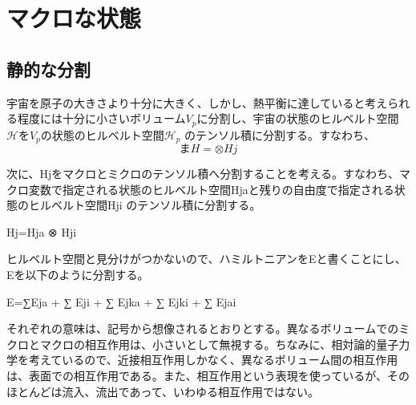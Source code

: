 \section{マクロな状態}
\subsection{静的な分割}
宇宙を原子の大きさより十分に大きく、しかし、熱平衡に達していると考えられる程度には十分に小さいボリューム$V_p$に分割し、宇宙の状態のヒルベルト空間$\mathcal{H}$を$V_p$の状態のヒルベルト空間$\mathcal{H}_p$ のテンソル積に分割する。すなわち、
\begin{equation}
まH=⊗Hj
\end{equation}

次に、Hjをマクロとミクロのテンソル積へ分割することを考える。すなわち、マクロ変数で指定される状態のヒルベルト空間Hjaと残りの自由度で指定される状態のヒルベルト空間Hji のテンソル積に分割する。

Hj=Hja ⊗ Hji

ヒルベルト空間と見分けがつかないので、ハミルトニアンをEと書くことにし、Eを以下のように分割する。

E=∑Eja + ∑ Eji + ∑ Ejka + ∑ Ejki + ∑ Ejai

それぞれの意味は、記号から想像されるとおりとする。異なるボリュームでのミクロとマクロの相互作用は、小さいとして無視する。ちなみに、相対論的量子力学を考えているので、近接相互作用しかなく、異なるボリューム間の相互作用は、表面での相互作用である。また、相互作用という表現を使っているが、そのほとんどは流入、流出であって、いわゆる相互作用ではない。